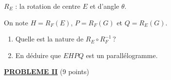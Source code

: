 \begin{description}
\begin{mitanisa}
\begin{mitanisa}
                                          $R_E$ : la rotation de centre $E$ et d'angle $\theta$. 
                                    \end{mitanisa}
                              On note $H = R_F (E)$, $P = R_F (G)$ et $Q = R_E (G)$.
                        \end{mitanisa}
                  \begin{enumerate}
                        \item Quelle est la nature de $R_E \circ R_F^{-1}$\,?
                        \item En d\'eduire que $EHPQ$ est un parall\'elogramme.
                  \end{enumerate}
      \end{description}
\noindent \underline{\textsc{\textbf{PROBLEME II}}} (9 points)
